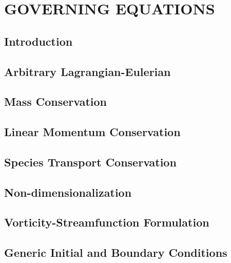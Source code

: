 \chapter{\textbf{GOVERNING EQUATIONS}}
\label{eqgov}

\section{\textbf{Introduction}} 


\section{\textbf{Arbitrary Lagrangian-Eulerian}} 
\label{ale}


\section{\textbf{Mass Conservation}} 
\label{conservacao massa}


\section{\textbf{Linear Momentum Conservation}} 
\label{conservacao movimento}


\section{\textbf{Species Transport Conservation}} 
\label{conservacao especie}


\section{\textbf{Non-dimensionalization}} 
\label{adimensionalizacao}


\section{\textbf{Vorticity-Streamfunction Formulation}} 
\label{corrente vorticidade}


\section{\textbf{Generic Initial and Boundary Conditions}} 
\label{condicoes contorno}


